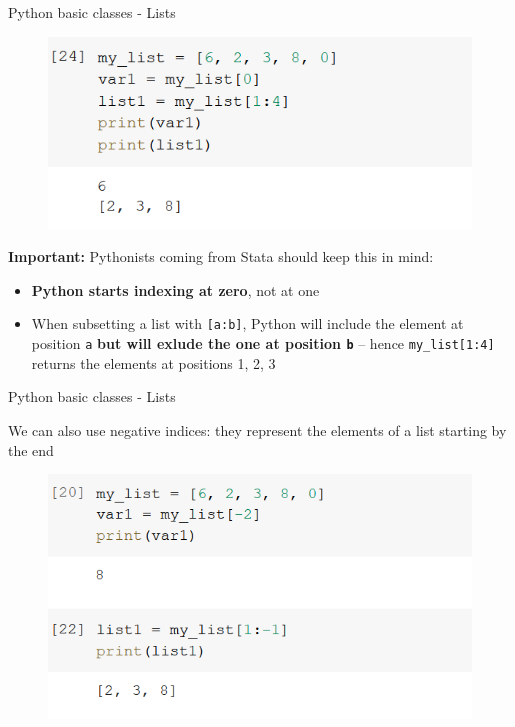 \documentclass[aspectratio=169]{beamer}
\begin{document}
\begin{frame}{Python basic classes - Lists}

	\begin{figure}
		\centering
		\includegraphics[width=0.53\linewidth]{img/list_subset_warnings.png}
	\end{figure}

	\textbf{Important:} Pythonists coming from Stata should keep this in mind:

	\begin{itemize}
		\item \textbf{Python starts indexing at zero}, not at one
		\item When subsetting a list with \texttt{[a:b]}, Python will include the element at position \texttt{a} \textbf{but will exlude the one at position \texttt{b}} \scriptsize-- hence \texttt{my\_list[1:4]} returns the elements at positions 1, 2, 3 \normalsize
	\end{itemize}

\end{frame}

\begin{frame}{Python basic classes - Lists}

	We can also use negative indices: they represent the elements of a list starting by the end

	\begin{figure}
		\centering
		\includegraphics[width=0.6\linewidth]{img/list_subset_negative.png}
	\end{figure}

\end{frame}
\end{document}
